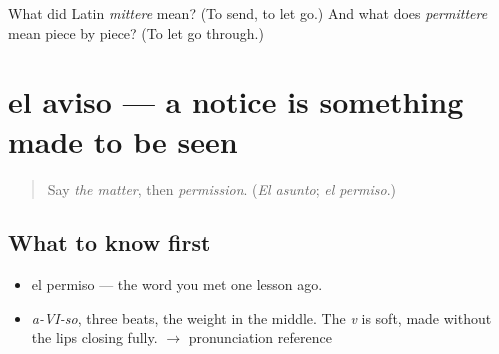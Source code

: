 \begin{tcolorbox}[breakable,colback=teal!4,colframe=teal!35!black,title={Before you move on}]
What did Latin \emph{mittere} mean? (To send, to let go.) And what does \emph{permittere} mean piece by piece? (To let go through.)
\end{tcolorbox}
\section[el aviso]{el aviso — a notice is something made to be seen}

\label{lesson:ES-C332-aviso}



\begin{quote}
Say \emph{the matter}, then \emph{permission}. (\emph{El asunto}; \emph{el permiso}.)
\end{quote}

\subsection*{What to know first}
\begin{itemize}
\raggedright
  \item el permiso — the word you met one lesson ago.
\end{itemize}

\begin{sounds}
\begin{itemize}
\raggedright
  \item \emph{a-VI-so}, three beats, the weight in the middle. The \emph{v} is soft, made without the lips closing fully. $\to$ pronunciation reference
\end{itemize}
\end{sounds}

